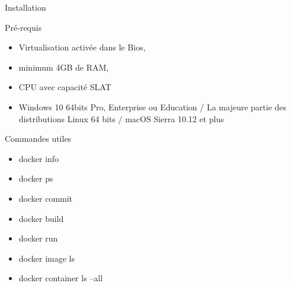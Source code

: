 \begin{frame}[fragile]{Installation }
    \begin{block}{Pré-requis}
        \begin{itemize}
            \item Virtualisation activée dans le Bios,
            \item minimum 4GB de RAM,
            \item CPU avec capacité SLAT
            \item Windows 10 64bits Pro, Enterprise ou Education / La majeure partie des distributions Linux 64 bits / macOS Sierra 10.12 et plus
        \end{itemize}
    \end{block}
\end{frame}

\begin{frame}{Commandes utiles}
    \begin{itemize}
        \item docker info
        \item docker ps
        \item docker commit
        \item docker build
        \item docker run 
        \item docker image ls
        \item docker container ls --all
    \end{itemize}
\end{frame}
